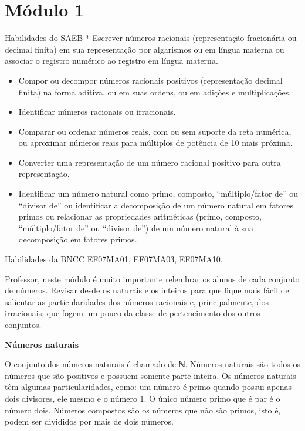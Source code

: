 \chapter{Módulo 1}

Habilidades do SAEB * Escrever números racionais (representação
fracionária ou decimal finita) em sua representação por algarismos ou em
língua materna ou associar o registro numérico ao registro em língua
materna.

\begin{itemize}
\item
  Compor ou decompor números racionais positivos (representação decimal
  finita) na forma aditiva, ou em suas ordens, ou em adições e
  multiplicações.
\item
  Identificar números racionais ou irracionais.
\item
  Comparar ou ordenar números reais, com ou sem suporte da reta
  numérica, ou aproximar números reais para múltiplos de potência de 10
  mais próxima.
\item
  Converter uma representação de um número racional positivo para outra
  representação.
\item
  Identificar um número natural como primo, composto, ``múltiplo/fator
  de'' ou ``divisor de'' ou identificar a decomposição de um número
  natural em fatores primos ou relacionar as propriedades aritméticas
  (primo, composto, ``múltiplo/fator de'' ou ``divisor de'') de um
  número natural à sua decomposição em fatores primos.
\end{itemize}

Habilidades da BNCC EF07MA01, EF07MA03, EF07MA10.

Professor, neste módulo é muito importante relembrar os alunos de cada
conjunto de números. Revisar desde os naturais e os inteiros para que
fique mais fácil de salientar as particularidades dos números racionais
e, principalmente, dos irracionais, que fogem um pouco da classe de
pertencimento dos outros conjuntos.~

\textbf{Números naturais}

O conjunto dos números naturais é chamado de ℕ. Números naturais são
todos os números que são positivos e possuem somente parte inteira. Os
números naturais têm algumas particularidades, como: um número é primo
quando possui apenas dois divisores, ele mesmo e o número 1. O único
número primo que é par é o número dois. Números compostos são os números
que não são primos, isto é, podem ser divididos por mais de dois
números.~

